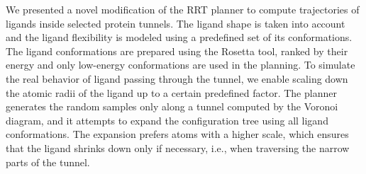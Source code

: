 \documentclass[usletter, 10pt, conference]{ieeeconf} %
\begin{document}
We presented a novel modification of the RRT planner to compute trajectories of ligands inside selected protein tunnels.
The ligand shape is taken into account and the ligand flexibility is modeled using a predefined set of its conformations.
The ligand conformations are prepared using the Rosetta tool, ranked by their energy and only low-energy conformations are used in the planning.
To simulate the real behavior of ligand passing through the tunnel, we enable scaling down the atomic radii of the ligand up to a certain predefined factor.
The planner generates the random samples only along a tunnel computed by the Voronoi diagram, and it attempts to expand the configuration
tree using all ligand conformations. 
The expansion prefers atoms with a higher scale, which ensures that the ligand shrinks down only if necessary, i.e., when traversing the narrow parts of the tunnel.




\end{document}
